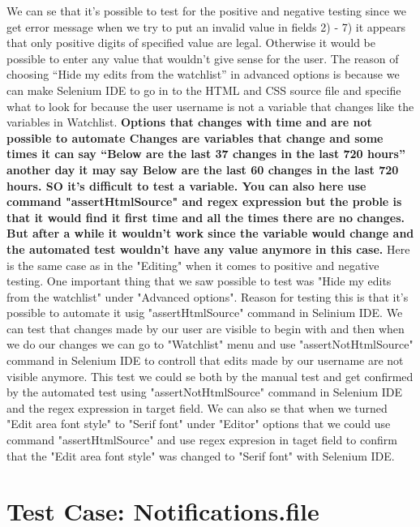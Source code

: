 \documentclass[a4paper,10pt]{article}
\begin{document}
We can se that it’s possible to test for the positive and negative testing since we get error message when we
try to put an invalid value in fields 2) - 7) it appears that only positive digits of specified value are legal. Otherwise
it would be possible to enter any value that wouldn’t give sense for the user. The reason of choosing “Hide my edits from the watchlist” in advanced options is because we can make Selenium IDE to go in to the HTML and CSS source file and specifie what to look for because the user 
username is not a variable that changes like the variables in Watchlist. \textbf{\color{red}Options that changes with time and are not possible to automate
Changes are variables that change and some times it can say “Below are the last 37 changes in the last 720 hours” another day it may say
Below are the last 60 changes in the last 720 hours. SO it’s difficult to test a variable. You can also here use command 
"assertHtmlSource" and regex expression but the proble is that it would find it first time and all the times there are no
changes. But after a while it wouldn't work since the variable would change and the automated test wouldn't have any
value anymore in this case.} 
Here is the same case as in the "Editing" when it comes to positive and negative testing. One important thing that
we saw possible to test was "Hide my edits from the watchlist" under "Advanced options". Reason for testing this is that it's
possible to automate it usig "assertHtmlSource" command in Selinium IDE. We can test that changes made by our user are visible 
to begin with and then when we do our changes we can go to "Watchlist" menu and use "assertNotHtmlSource" command in Selenium IDE
to controll that  edits made by our username are not visible anymore. This test we could se both by the manual test and get
confirmed by the automated test using "assertNotHtmlSource" command in Selenium IDE and the regex expression in target field.
We can also se that when we turned "Edit area font style" to "Serif font" under "Editor" options that we could use command
 "assertHtmlSource" and use regex expresion in taget field to confirm that the "Edit area font style" was changed to "Serif font" 
with Selenium IDE.


\section{Test Case: Notifications.file}
\end{document}
